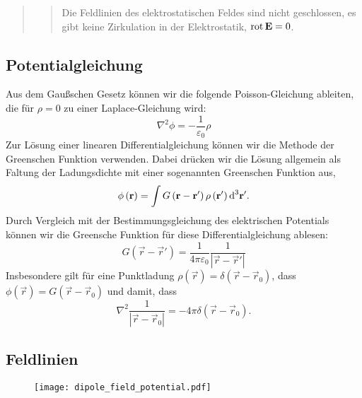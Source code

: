 \begin{quote}

	\begin{quote}
		Die Feldlinien des elektrostatischen Feldes sind nicht geschlossen, es gibt keine Zirkulation in der Elektrostatik, $\operatorname{rot} \mathbf{E}=0$.
	\end{quote}

\end{quote}
\subsection{Potentialgleichung\label{ref-021}}

Aus dem Gaußschen Gesetz können wir die folgende Poisson-Gleichung ableiten, die für $\rho =0$ zu einer Laplace-Gleichung wird:
\begin{equation}
	\label{3.8}
	\boxed{\nabla ^{2}\phi =-\frac{1}{\varepsilon _{0}}\rho }
\end{equation}
Zur Lösung einer linearen Differentialgleichung können wir die Methode der Greenschen Funktion verwenden. Dabei drücken wir die Lösung allgemein als Faltung der Ladungsdichte mit einer sogenannten Greenschen Funktion aus,
\begin{equation}
	\label{3.9}
	\phi \left(\mathbf{r}\right)=\int G\left(\mathbf{r}-\mathbf{r}'\right)\rho \left(\mathbf{r}'\right)\text{d} ^{3}\mathbf{r}'.
\end{equation}
Durch Vergleich mit der Bestimmungsgleichung des elektrischen Potentials können wir die Greensche Funktion für diese Differentialgleichung ablesen:
\begin{equation}
	\label{3.10}
	G\left(\vec {r}-\vec {r}'\right)=\frac{1}{4\pi \varepsilon _{0}}\frac{1}{\left| \vec {r}-\vec {r}'\right| }
\end{equation}
Insbesondere gilt für eine Punktladung $\rho \left(\vec {r}\right)=\delta \left(\vec {r}-\vec {r}_{0}\right)$, dass $\phi \left(\vec {r}\right)=G\left(\vec {r}-\vec {r}_{0}\right)$ und damit, dass
\begin{equation*}
	\nabla ^{2}\frac{1}{\left| \vec {r}-\vec {r}_{0}\right| }=-4\pi \delta \left(\vec {r}-\vec {r}_{0}\right).
\end{equation*}
\subsection{Feldlinien\label{ref-022}}



\begin{figure}[htb]
	\centering
	\texttt{[image: dipole\_field\_potential.pdf]}
	\caption{}
	\label{fig:dipole_field_potential}
\end{figure}

